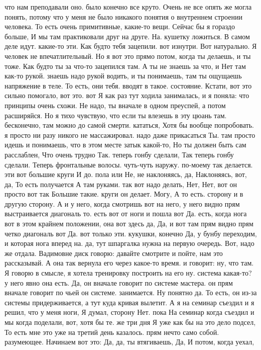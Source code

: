 что нам преподавали оно.
было конечно все круто.
Очень не все опять же могла понять, потому что у меня не было никакого понятия о внутреннем строении человека.
То есть очень примитивные, какие-то вещи.
Сейчас бы я гораздо больше, И мы там практиковали друг на друге.
На.
кушетку ложиться. В самом деле идут.
какие-то эти.
Как будто тебя зацепили. вот изнутри.
Вот натурально.
Я человек не впечатлительный.
Но я вот это прямо потом, когда ты делаешь, и ты тоже.
Как будто ты за что-то зацепился там.
А ты не знаешь за что, и Нет там как-то рукой. знаешь надо рукой водить, и ты понимаешь, там ты ощущаешь напряжение в теле.
То есть, они тебя.
вводят в такое.
состояние. Кстати, вот это сильно помогало, вот это. вот Я как раз тут ходила занималась, и я поняла:
что принципы очень схожи.
Не надо, ты вначале в одном преуспей, а потом расширяйся. Но я тихо чувствую, что если
ты влезешь в эту цюань там.
бесконечно, там можно до самой смерти.
кататься, Хотя бы вообще попробовать. я просто ни разу никого не массажировал.
надо даже прикасаться Ты.
там просто идешь и понимаешь, что в
этом месте затык какой-то, Но ты должен быть сам расслаблен, Что очень трудно Так.
теперь гонбу сделали, Так теперь гонбу сделали. Теперь фронтальные волосы.
чуть-чуть наружу. по-моему так делается.
эти вот большие круги И до.
пола или Не, не наклоняясь, да, Наклоняясь, вот, да, То есть получается А там руками. так вот надо делать, Нет, Нет, вот он просто вот так Большие такие.
круги он делает. Могу, А то есть.
сторону и в другую сторону.
А и у него, когда смотришь вот на него, у него видно прям выстраивается диагональ то.
есть вот от ноги и пошла вот Да.
есть, когда нога вот в этом крайнем положении, она вот здесь да, Да, и вот там прям видно прям четко диагональ вот Да.
вот только эти.
кукушки, конечно Да, у бунбу переходим, и которая нога вперед на.
да, тут шпаргалка нужна на первую очередь.
Вот, надо же отдала.
Вадимовне диск говорю: давайте смотрите и пойте, нам это рассказывай. А она так вернула его через какое-то время.
и говорит: ну, что там.
Я говорю в смысле, я хотела тренировку построить на его ну.
система какая-то? у него явно она есть. Да, он вначале говорит по системе мастера. он прям вначале говорит по чьей он системе.
занимается. Ну понятно да. То есть, он из-за системы придерживается, а тут куда кривая вылетит.
А я на семинар съездил и я решил, что у меня ноги, Я думал, сторону Нет. пока На семинар когда съездил и мы когда поделали, вот,
хотя бы те.
же три дня Я уже как бы на это дело подсел, То есть мне это уже на третий день казалось.
прям нечто само собой.
разумеющее. Начинаем вот это: Да, да, ты втягиваешь, Да, И потом, когда уехал,
